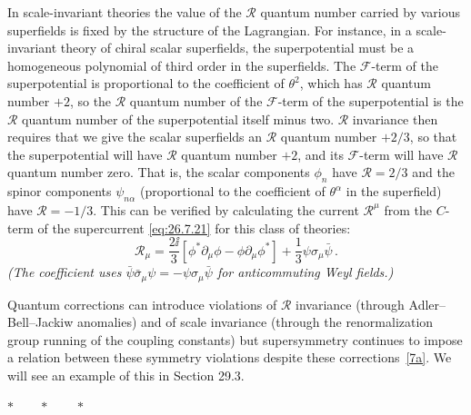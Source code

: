 In scale-invariant theories the value of the \(\mathcal{R}\) quantum number
carried by various superfields is fixed by the structure of the Lagrangian.
For instance, in a scale-invariant theory of chiral scalar superfields, the
superpotential must be a homogeneous polynomial of third order in the
superfields. The \(\mathcal{F}\)-term of the superpotential is proportional
to the coefficient of \(\theta^2\), which has \(\mathcal{R}\) quantum
number \(+2\), so the \(\mathcal{R}\) quantum number of the
\(\mathcal{F}\)-term of the superpotential is the \(\mathcal{R}\) quantum
number of the superpotential itself minus two. \(\mathcal{R}\) invariance
then requires that we give the scalar superfields an \(\mathcal{R}\) quantum
number \(+2/3\), so that the superpotential will have \(\mathcal{R}\)
quantum number \(+2\), and its \(\mathcal{F}\)-term will have
\(\mathcal{R}\) quantum number zero. That is, the scalar components \(\phi_n\)
have \(\mathcal{R}=2/3\) and the spinor components \(\psi_{n\alpha}\)
(proportional to the coefficient of \(\theta^\alpha\) in the superfield) have
\(\mathcal{R}=-1/3\). This can be verified by calculating the current
\(\mathcal{R}^\mu\) from the \(C\)-term of the supercurrent
\eqref{eq:26.7.21} for this class of theories:
\begin{equation}
  \mathcal{R}_\mu
  =\frac{2\ii}{3}
    [\phi^*\partial_\mu\phi-\phi\partial_\mu\phi^*]
   +\frac13\psi\sigma_\mu\bar\psi\,.
  \tag{26.7.52}\label{eq:26.7.52}
\end{equation}
\emph{(The coefficient uses
\(\bar\psi\bar\sigma_\mu\psi=-\psi\sigma_\mu\bar\psi\) for
anticommuting Weyl fields.)}

Quantum corrections can introduce violations of \(\mathcal{R}\) invariance
(through Adler--Bell--Jackiw anomalies) and of scale invariance (through the
renormalization group running of the coupling constants) but supersymmetry
continues to impose a relation between these symmetry violations despite
these corrections~\hyperref[ch26-ref-7a]{[7a]}. We will see an example of
this in Section 29.3.

\begin{center}
\(\ast\qquad\ast\qquad\ast\)
\end{center}

